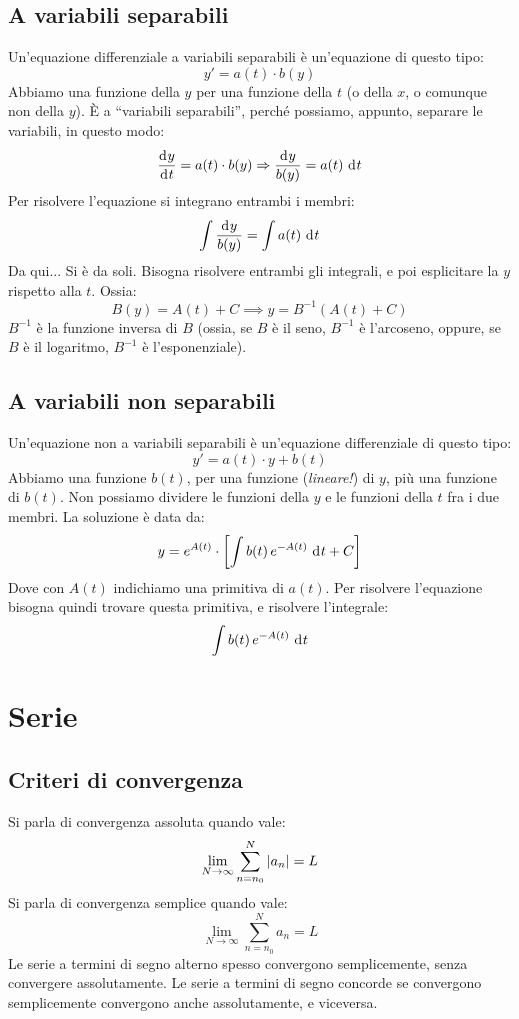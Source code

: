 \section{A variabili separabili}

Un'equazione differenziale a variabili separabili \`e un'equazione di 
questo tipo:
\[
y' = a(t) \cdot b(y)
\]
Abbiamo una funzione della $y$ per una funzione della $t$ (o della $x$, 
o comunque non della $y$). \`E a ``variabili separabili'', perch\'e 
possiamo, appunto, separare le variabili, in questo modo:
\[
\frac{\diff y}{\diff t} = a(t) \cdot b(y) \implies
\frac{\diff y}{b(y)} = a(t) \dx[t]
\]
Per risolvere l'equazione si integrano entrambi i membri:
\[
\int \frac{\diff y}{b(y)} = \int a(t) \dx[t]
\]
Da qui... Si \`e da soli. Bisogna risolvere entrambi gli integrali, 
e poi esplicitare la $y$ rispetto alla $t$. Ossia:
\[
B(y) = A(t) + C \implies
y = B^{-1}(A(t) + C)
\]
$B^{-1}$ \`e la funzione inversa di $B$ (ossia, se $B$ \`e il seno, 
$B^{-1}$ \`e l'arcoseno, oppure, se $B$ \`e il logaritmo, $B^{-1}$ \`e 
l'esponenziale).

\section{A variabili non separabili}

Un'equazione non a variabili separabili \`e un'equazione differenziale
di questo tipo:
\[
y' = a(t) \cdot y + b(t)
\]
Abbiamo una funzione $b(t)$, per una funzione (\emph{lineare!}) di $y$, 
pi\`u una funzione di $b(t)$. Non possiamo dividere le funzioni della $y$
e le funzioni della $t$ fra i due membri. La soluzione \`e data da:
\[
y = e^{A(t)} \cdot \left[ \int b(t) \, e^{-A(t)} \dx[t] + C \right]
\]
Dove con $A(t)$ indichiamo una primitiva di $a(t)$. Per risolvere 
l'equazione bisogna quindi trovare questa primitiva, e risolvere 
l'integrale:
\[
\int b(t) \, e^{-A(t)} \dx[t]
\]

\chapter{Serie}

\section{Criteri di convergenza}

Si parla di convergenza assoluta quando vale:
\[
\lim_{N \to \infty} \sum_{n = n_0}^{N} \left\lvert{a_n}\right\rvert = L
\]
Si parla di convergenza semplice quando vale:
\[
\lim_{N \to \infty} \sum_{n = n_0}^{N} a_n = L
\]
Le serie a termini di segno alterno spesso convergono semplicemente,
senza convergere assolutamente. Le serie a termini di segno concorde
se convergono semplicemente convergono anche assolutamente, e viceversa.

